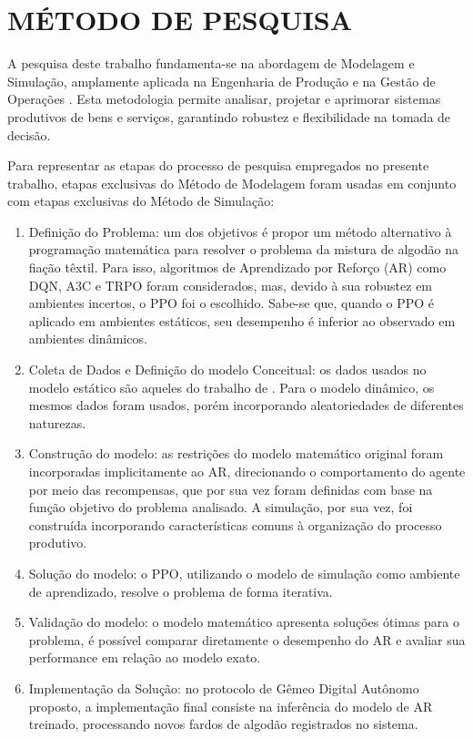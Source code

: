 \documentclass[
    12pt,                %
    openright,           %
    oneside,             %
    a4paper,             %
    english,             %
    spanish,             %
    brazil               %
]{ufscar}
\begin{document}
\chapter{MÉTODO DE PESQUISA}

A pesquisa deste trabalho fundamenta-se na abordagem de Modelagem e Simulação, amplamente aplicada na Engenharia de Produção e na Gestão de Operações \cite{ganga_metodologia_2011}. Esta metodologia permite analisar, projetar e aprimorar sistemas produtivos de bens e serviços, garantindo robustez e flexibilidade na tomada de decisão. 

Para representar as etapas do processo de pesquisa empregados no presente trabalho, etapas exclusivas do Método de Modelagem foram usadas em conjunto com etapas exclusivas do Método de Simulação:

\begin{enumerate}
    \item Definição do Problema: um dos objetivos é propor um método alternativo à programação matemática para resolver o problema da mistura de algodão na fiação têxtil. Para isso, algoritmos de Aprendizado por Reforço (AR) como DQN, A3C e TRPO foram considerados, mas, devido à sua robustez em ambientes incertos, o PPO foi o escolhido. Sabe-se que, quando o PPO é aplicado em ambientes estáticos, seu desempenho é inferior ao observado em ambientes dinâmicos.

    \item Coleta de Dados e Definição do modelo Conceitual: os dados usados no modelo estático são aqueles do trabalho de . Para o modelo dinâmico, os mesmos dados foram usados, porém incorporando aleatoriedades de diferentes naturezas. 
    
    \item Construção do modelo: as restrições do modelo matemático original foram incorporadas implicitamente ao AR, direcionando o comportamento do agente por meio das recompensas, que por sua vez foram definidas com base na função objetivo do problema analisado. A simulação, por sua vez, foi construída incorporando características comuns à organização do processo produtivo.
    
    \item Solução do modelo: o PPO, utilizando o modelo de simulação como ambiente de aprendizado, resolve o problema de forma iterativa.
    
    \item Validação do modelo: o modelo matemático apresenta soluções ótimas para o problema, é possível comparar diretamente o desempenho do AR e avaliar sua performance em relação ao modelo exato.
    
    \item Implementação da Solução: no protocolo de Gêmeo Digital Autônomo proposto, a implementação final consiste na inferência do modelo de AR treinado, processando novos fardos de algodão registrados no sistema.
\end{enumerate}
\end{document}
